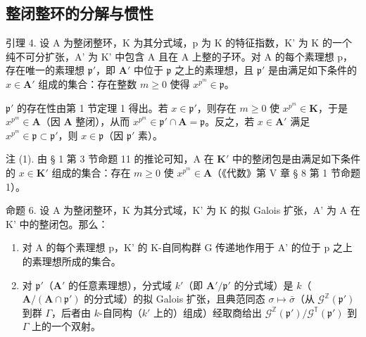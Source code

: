 \subsection{整闭整环的分解与惯性}

引理 4. 设 A 为整闭整环，K 为其分式域，p 为 K 的特征指数，K' 为 K 的一个纯不可分扩张，A' 为 K' 中包含 A 且在 A 上整的子环。对 A 的每个素理想 p，存在唯一的素理想 \(\mathfrak{p}'\)，即 \(\mathbf{A}'\) 中位于 \(\mathfrak{p}\) 之上的素理想，且 \(\mathfrak{p}'\) 是由满足如下条件的 \(x \in \mathbf{A}'\) 组成的集合：存在整数 \(m \geqslant 0\) 使得 \(x^{p^m} \in \mathfrak{p}\)。

\(\mathfrak{p}'\) 的存在性由第 1 节定理 1 得出。若 \(x \in \mathfrak{p}'\)，则存在 \(m \geqslant 0\) 使 \(x^{p^m} \in \mathbf{K}\)，于是 \(x^{p^m} \in \mathbf{A}\)（因 \(\mathbf{A}\) 整闭），从而 \(x^{p^m} \in \mathfrak{p}' \cap \mathbf{A} = \mathfrak{p}\)。反之，若 \(x \in \mathbf{A}'\) 满足 \(x^{p^m} \in \mathfrak{p} \subset \mathfrak{p}'\)，则 \(x \in \mathfrak{p}\)（因 \(\mathfrak{p}'\) 素）。

注 (1). 由 § 1 第 3 节命题 11 的推论可知，A 在 \(\mathbf{K}'\) 中的整闭包是由满足如下条件的 \(x \in \mathbf{K}'\) 组成的集合：存在 \(m \geqslant 0\) 使 \(x^{p^m} \in \mathbf{A}\)（《代数》第 V 章 § 8 第 1 节命题 1）。

命题 6. 设 A 为整闭整环，K 为其分式域，K' 为 K 的拟 Galois 扩张，A' 为 A 在 K' 中的整闭包。那么：

\begin{enumerate}
\def\labelenumi{(\roman{enumi})}
\item
  对 A 的每个素理想 p，K' 的 K-自同构群 G 传递地作用于 A' 的位于 p 之上的素理想所成的集合。
\item
  对 \(\mathfrak{p}'\)（\(\mathbf{A}'\) 的任意素理想），分式域 \(k'\)（即 \(\mathbf{A}' / \mathfrak{p}'\) 的分式域）是 \(k\)（\(\mathbf{A} / (\mathbf{A} \cap \mathfrak{p}')\) 的分式域）的拟 Galois 扩张，且典范同态 \(\sigma \mapsto \bar{\sigma}\)（从 \(\mathcal{G}^{\mathbb{Z}}(\mathfrak{p}')\) 到群 \(\Gamma\)，后者由 \(k\)-自同构（\(k'\) 上的）组成）经取商给出 \(\mathcal{G}^{\mathbb{Z}}(\mathfrak{p}') / \mathcal{G}^{\mathbb{T}}(\mathfrak{p}')\) 到 \(\Gamma\) 上的一个双射。
\end{enumerate}

